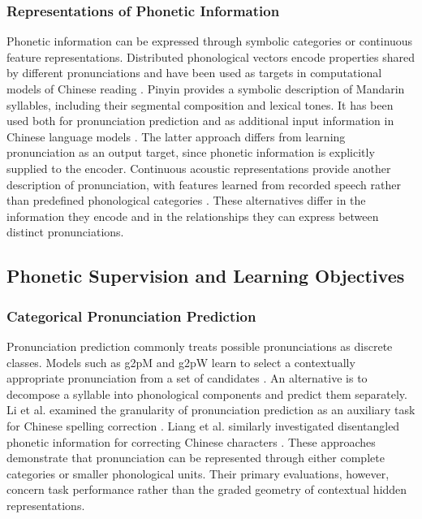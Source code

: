 \subsubsection{Representations of Phonetic Information}
\label{sec:lr-phonetic-representations}

Phonetic information can be expressed through symbolic categories or continuous
feature representations. Distributed phonological vectors encode properties
shared by different pronunciations and have been used as targets in
computational models of Chinese reading \cite{ref_yang2009,ref_kuo2025}. Pinyin
provides a symbolic description of Mandarin syllables, including their segmental
composition and lexical tones. It has been used both for pronunciation
prediction and as additional input information in Chinese language models
\cite{ref_g2pm2020,ref_chinesebert2021}. The latter approach differs from
learning pronunciation as an output target, since phonetic information is
explicitly supplied to the encoder. Continuous acoustic representations provide
another description of pronunciation, with features learned from recorded speech
rather than predefined phonological categories \cite{ref_bartelds2022}. These
alternatives differ in the information they encode and in the relationships they
can express between distinct pronunciations.


\subsection{Phonetic Supervision and Learning Objectives}
\label{sec:lr-supervision}

\subsubsection{Categorical Pronunciation Prediction}
\label{sec:lr-categorical}

Pronunciation prediction commonly treats possible pronunciations as discrete
classes. Models such as g2pM and g2pW learn to select a contextually appropriate
pronunciation from a set of candidates \cite{ref_g2pm2020,ref_g2pw2022}. An
alternative is to decompose a syllable into phonological components and predict
them separately. Li et al. examined the granularity of pronunciation prediction
as an auxiliary task for Chinese spelling correction \cite{ref_li_scope2022}.
Liang et al. similarly investigated disentangled phonetic information for
correcting Chinese characters \cite{ref_liang2023}. These approaches demonstrate
that pronunciation can be represented through either complete categories or
smaller phonological units. Their primary evaluations, however, concern task
performance rather than the graded geometry of contextual hidden
representations.

